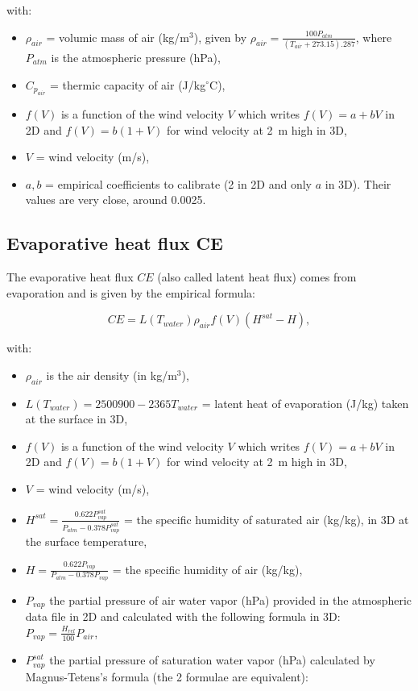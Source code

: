 with:
\begin{itemize}
  \item $\rho_{air}$ = volumic mass of air (kg/m$^3$),
    given by $\rho_{air} = \frac{100 P_{atm}}{(T_{air} + 273.15).287}$,
    where $P_{atm}$ is the atmospheric pressure (hPa),
  \item $C_{p_{air}}$ = thermic capacity of air (J/kg$^{\circ}$C),
  \item $f(V)$ is a function of the wind velocity $V$
    which writes $f(V) = a+bV$ in 2D and
    $f(V) = b(1+V)$ for wind velocity at 2~m high in 3D,
  \item $V$ = wind velocity (m/s),
  \item $a, b$ = empirical coefficients
    to calibrate (2 in 2D and only $a$ in 3D).
    Their values are very close, around 0.0025.
\end{itemize}

\subsection{Evaporative heat flux CE}

The evaporative heat flux $CE$ (also called latent heat flux)
comes from evaporation and is given by the empirical formula:

\begin{equation}
  CE = L(T_{water}) \rho_{air} f(V) (H^{sat} - H),
\end{equation}

with:
\begin{itemize}
  \item $\rho_{air}$ is the air density (in kg/m$^3$),
  \item $L(T_{water}) = 2500900 - 2365 T_{water}$ = latent heat of evaporation (J/kg)
    taken at the surface in 3D,
  \item $f(V)$ is a function of the wind velocity $V$
    which writes $f(V) = a+bV$ in 2D and
    $f(V) = b(1+V)$ for wind velocity at 2~m high in 3D,
  \item $V$ = wind velocity (m/s),
  \item $H^{sat} = \frac{0.622 P_{vap}^{sat}}{P_{atm}-0.378 P_{vap}^{sat}}$
    = the specific humidity of saturated air (kg/kg),
    in 3D at the surface temperature,
  \item $H = \frac{0.622 P_{vap}}{P_{atm}-0.378 P_{vap}}$
    = the specific humidity of air (kg/kg),
  \item $P_{vap}$ the partial pressure of air water vapor (hPa)
    provided in the atmospheric data file in 2D
    and calculated with the following formula in 3D:
    $P_{vap} = \frac{H_{rel}}{100} P_{air}$,
  \item  $P_{vap}^{sat}$ the partial pressure of saturation water vapor (hPa)
    calculated by Magnus-Tetens's formula
    (the 2 formulae are equivalent):
\end{itemize}

